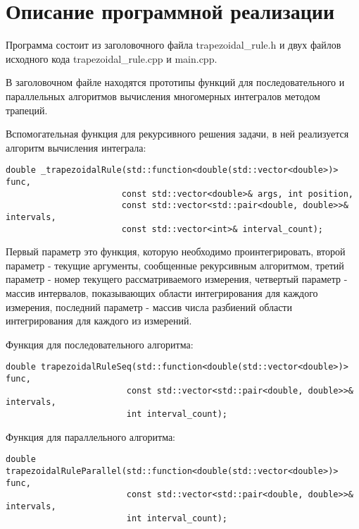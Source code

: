 \documentclass{report}
\begin{document}
\section*{Описание программной реализации}
Программа состоит из заголовочного файла trapezoidal\_rule.h и двух файлов исходного кода trapezoidal\_rule.cpp и main.cpp.
\par В заголовочном файле находятся прототипы функций для последовательного и параллельных алгоритмов вычисления многомерных интегралов методом трапеций.
\par Вспомогательная функция для рекурсивного решения задачи, в ней реализуется алгоритм вычисления интеграла:
\begin{lstlisting}
double _trapezoidalRule(std::function<double(std::vector<double>)> func,
                       const std::vector<double>& args, int position,
                       const std::vector<std::pair<double, double>>& intervals,
                       const std::vector<int>& interval_count);
\end{lstlisting}
\par Первый параметр это функция, которую необходимо проинтегрировать, второй параметр - текущие аргументы, сообщенные рекурсивным алгоритмом, третий параметр - номер текущего рассматриваемого измерения,  четвертый параметр - массив интервалов, показывающих области интегрирования для каждого измерения, последний параметр - массив числа разбиений области интегрирования для каждого из измерений.
\par Функция для последовательного алгоритма:
\begin{lstlisting}
double trapezoidalRuleSeq(std::function<double(std::vector<double>)> func,
                        const std::vector<std::pair<double, double>>& intervals,
                        int interval_count);
\end{lstlisting}
\par Функция для параллельного алгоритма:
\begin{lstlisting}
double trapezoidalRuleParallel(std::function<double(std::vector<double>)> func,
                        const std::vector<std::pair<double, double>>& intervals,
                        int interval_count);
\end{lstlisting}
\end{document}
